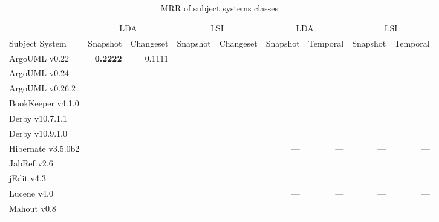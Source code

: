 \begin{table*}[t]
\renewcommand{\arraystretch}{1.3}
\footnotesize
\centering
\caption{MRR of subject systems classes}
\begin{tabular}{l|rr|rr||rr|rr}
    \toprule
                        & \multicolumn{2}{c|}{LDA}      &  \multicolumn{2}{c||}{LSI}    & \multicolumn{2}{c|}{LDA}      &  \multicolumn{2}{c}{LSI}  \\
    Subject System      & Snapshot      & Changeset     & Snapshot      & Changeset     & Snapshot      & Temporal      & Snapshot      & Temporal  \\
    \midrule
    ArgoUML v0.22       & {\bf 0.2222}  &  0.1111       &               &               &               &               &               &           \\
    ArgoUML v0.24       &               &               &               &               &               &               &               &           \\
    ArgoUML v0.26.2     &               &               &               &               &               &               &               &           \\
    BookKeeper v4.1.0   &               &               &               &               &               &               &               &           \\
    Derby v10.7.1.1     &               &               &               &               &               &               &               &           \\
    Derby v10.9.1.0     &               &               &               &               &               &               &               &           \\
    Hibernate v3.5.0b2  &               &               &               &               & ---           & ---           & ---           & ---       \\
    JabRef v2.6         &               &               &               &               &               &               &               &           \\
    jEdit v4.3          &               &               &               &               &               &               &               &           \\
    Lucene v4.0         &               &               &               &               & ---           & ---           & ---           & ---       \\
    Mahout v0.8         &               &               &               &               &               &               &               &           \\

\end{tabular}
\end{table*}
